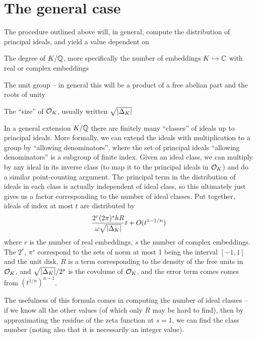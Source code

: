 \documentclass[11pt]{article}
\begin{document}
\section{The general case}
The procedure outlined above will, in general, compute the distribution of principal ideals, and yield a value dependent on
\begin{enum}
    \item The degree of $K / \mathbb{Q}$, more specifically the number of embeddings $K \hookrightarrow \mathbb{C}$ with real or complex embeddings
    \item The unit group -- in general this will be a product of a free abelian part and the roots of unity
    \item The ``size'' of $\mathcal{O}_K$, usually written $\sqrt{\left| \Delta_K \right|}$
\end{enum}
In a general extension $K / \mathbb{Q}$ there are finitely many ``classes'' of ideals up to principal ideals. More formally, we can extend the ideals with multiplication to a group by ``allowing denominators'', where the set of principal ideals ``allowing denominators'' is a subgroup of finite index. Given an ideal class, we can multiply by any ideal in its inverse class (to map it to the principal ideals in $\mathcal{O}_K$) and do a similar point-counting argument. The principal term in the distribution of ideals in each class is actually independent of ideal class, so this ultimately just gives us a factor corresponding to the number of ideal classes. Put together, ideals of index at most $t$ are distributed by
$$
    \frac{2^r(2\pi)^shR}{\omega \sqrt{\left| \Delta_K \right|}}t + O(t^{1 - 1/n})
$$
where $r$ is the number of real embeddings, $s$ the number of complex embeddings. The $2^r$, $\pi^s$ correspond to the sets of norm at most 1 being the interval $[-1, 1]$ and the unit disk, $R$ is a term corresponding to the density of the free units in $\mathcal{O}_K$, and $\sqrt{\left| \Delta_K \right|}/2^s$ is the covolume of $\mathcal{O}_K$, and the error term comes comes from $(t^{1/n})^{n - 1}$.

The usefulness of this formula comes in computing the number of ideal classes -- if we know all the other values (of which only $R$ may be hard to find), then by approximating the residue of the zeta function at $s = 1$, we can find the class number (noting also that it is necessarily an integer value).
\end{document}
